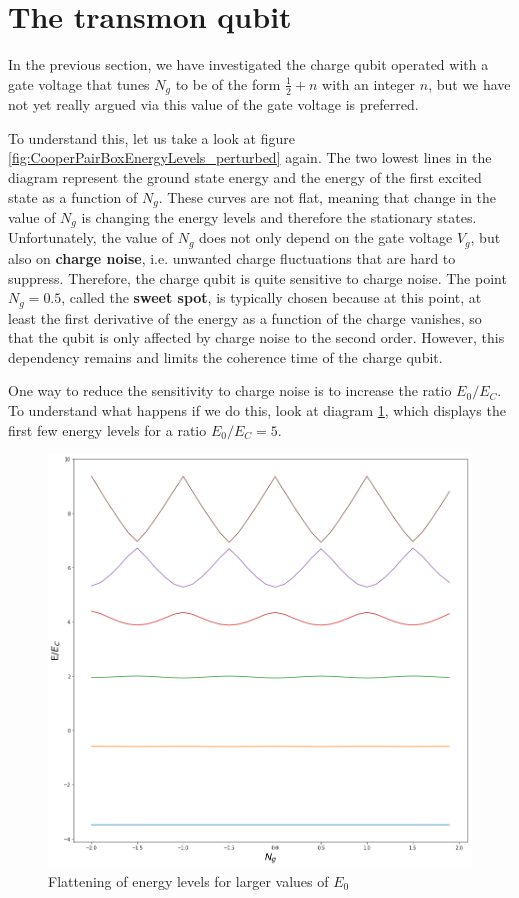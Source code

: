\documentclass[a4paper, draft]{article}
\theoremstyle{own}
\theoremstyle{remark}
\begin{document}
\section{The transmon qubit}

In the previous section, we have investigated the charge qubit operated with a gate voltage that tunes $N_g$ to be of the form $\frac{1}{2} + n$ with an integer $n$, but we have not yet really argued via this value of the gate voltage is preferred. 

To understand this, let us take a look at figure \ref{fig:CooperPairBoxEnergyLevels_perturbed} again. The two lowest lines in the diagram represent the ground state energy and the energy of the first excited state as a function of $N_g$. These curves are not flat, meaning that change in the value of $N_g$ is changing the energy levels and therefore the stationary states. Unfortunately, the value of $N_g$ does not only depend on the gate voltage $V_g$, but also on {\bf charge noise}, i.e. unwanted charge fluctuations that are hard to suppress. Therefore, the charge qubit is quite sensitive to charge noise. The point $N_g = 0.5$, called the {\bf sweet spot}, is typically chosen because at this point, at least the first derivative of the energy as a function of the charge vanishes, so that the qubit is only affected by charge noise to the second order. However, this dependency remains and limits the coherence time of the charge qubit.

One way to reduce the sensitivity to charge noise is to increase the ratio $E_0 / E_C$. To understand what happens if we do this, look at diagram \ref{fig:CooperPairBoxEnergyLevels_Transmon}, which displays the first few energy levels for a ratio $E_0 / E_C = 5$.

\begin{figure}[ht]
\centering
\includegraphics[width=0.7\linewidth]{images/CooperPairBoxEnergyLevels_Transmon}
\caption[Flattening of energy levels for larger values of $E_0$]{Flattening of energy levels for larger values of $E_0$}
\label{fig:CooperPairBoxEnergyLevels_Transmon}
\end{figure}
\end{document}
